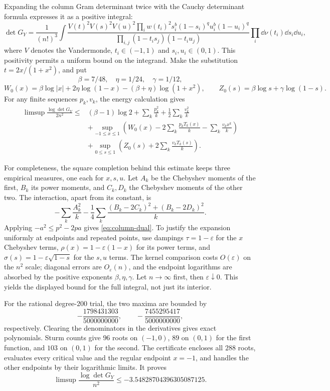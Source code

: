 Expanding the column Gram determinant twice with the Cauchy determinant
formula expresses it as a positive integral:
\[
 \det G_Y=\frac1{(n!)^3}\int
 \frac{V(t)^2V(s)^2V(u)^2
       \prod_i w(t_i)^2s_i^b(1-s_i)^qu_i^b(1-u_i)^q}
      {\prod_{i,j}(1-t_is_j)(1-t_iu_j)}
 \prod_i\dd\nu(t_i)\dd s_i\dd u_i,
\]
where $V$ denotes the Vandermonde, $t_i\in(-1,1)$ and $s_i,u_i\in(0,1)$.
This positivity permits a uniform bound on the integrand.
Make the substitution $t=2x/(1+x^2)$, and put
\[
 \beta=7/48,\quad\eta=1/24,\quad\gamma=1/12,
\]
\[
 W_0(x)=\beta\log|x|+2\eta\log(1-x)-(\beta+\eta)\log(1+x^2),
 \qquad Z_0(s)=\beta\log s+\gamma\log(1-s).
\]
For any finite sequences $p_k,v_k$, the energy calculation gives
\begin{align}\label{eq:column-dual}
 \limsup\frac{\log\det G_Y}{2n^2}
 \le{}&(\beta-1)\log2+\sum_k\frac{p_k^2}{k}
                         +\frac12\sum_k\frac{v_k^2}{k}\nonumber\\
 &+\sup_{-1\le x\le1}\left(W_0(x)-2\sum_k\frac{p_kT_k(x)}k
                                      -\sum_k\frac{v_kx^k}k\right)\nonumber\\
 &+\sup_{0\le s\le1}\left(Z_0(s)+2\sum_k\frac{v_kT_k(s)}k\right).
\end{align}

For completeness, the square completion behind this estimate keeps
three empirical measures, one each for $x,s,u$. Let $A_k$ be the
Chebyshev moments of the first, $B_k$ its power moments, and $C_k,D_k$
the Chebyshev moments of the other two. The interaction, apart from
its constant, is
\[
 -\sum_k\frac{A_k^2}{k}
 -\frac14\sum_k\frac{(B_k-2C_k)^2+(B_k-2D_k)^2}{k}.
\]
Applying $-a^2\le p^2-2pa$ gives \eqref{eq:column-dual}.
To justify the expansion uniformly at endpoints and repeated points,
use dampings $\tau=1-\varepsilon$ for the $x$ Chebyshev terms,
$\rho(x)=1-\varepsilon(1-x)$ for its power terms, and
$\sigma(s)=1-\varepsilon\sqrt{1-s}$ for the $s,u$ terms.
The kernel comparison costs $O(\varepsilon)$ on the $n^2$ scale;
diagonal errors are $O_\varepsilon(n)$, and the endpoint logarithms
are absorbed by the positive exponents $\beta,\eta,\gamma$.
Let $n\to\infty$ first, then $\varepsilon\downarrow0$. This yields
the displayed bound for the full integral, not just its interior.

For the rational degree-$200$ trial, the two maxima are bounded by
\[
 -\frac{1798431303}{5000000000},\qquad
 -\frac{7455295417}{5000000000},
\]
respectively. Clearing the denominators in the derivatives gives exact
polynomials. Sturm counts give $96$ roots on $(-1,0)$, $89$ on $(0,1)$
for the first function, and $103$ on $(0,1)$ for the second.
The certificate encloses all $288$ roots, evaluates every critical
value and the regular endpoint $x=-1$, and handles the other endpoints
by their logarithmic limits. It proves
\begin{equation}\label{eq:column-rate}
 \limsup\frac{\log\det G_Y}{n^2}
 \le-3.54828704396305087125.
\end{equation}

